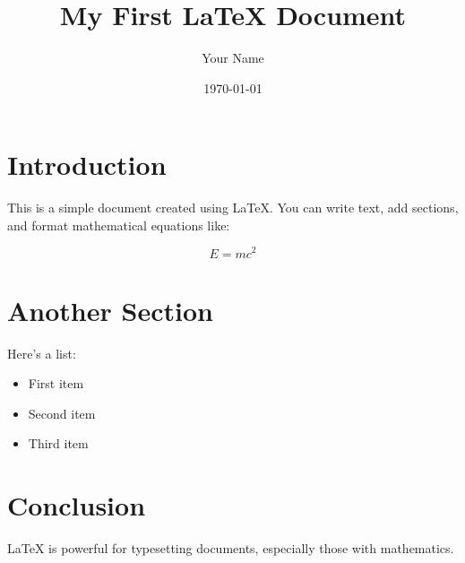 \documentclass{article}
\title{My First LaTeX Document}
\author{Your Name}
\date{\today}
\begin{document}
\maketitle

\section{Introduction}
This is a simple document created using \LaTeX. You can write text, add sections, and format mathematical equations like:

\[
E = mc^2
\]

\section{Another Section}
Here's a list:
\begin{itemize}
    \item First item
    \item Second item
    \item Third item
\end{itemize}

\section{Conclusion}
LaTeX is powerful for typesetting documents, especially those with mathematics.
\end{document}
